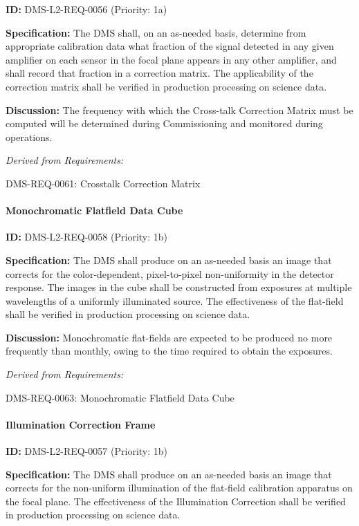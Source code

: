 \documentclass[SE,toc,lsstdraft]{lsstdoc}
\begin{document}
\label{DMS-L2-REQ-0056}
\textbf{ID:} DMS-L2-REQ-0056 (Priority: 1a)

\textbf{Specification:} The DMS shall, on an as-needed basis, determine from appropriate calibration data what fraction of the signal detected in any given amplifier on each sensor in the focal plane appears in any other amplifier, and shall record that fraction in a correction matrix. The applicability of the correction matrix shall be verified in production processing on science data.

\textbf{Discussion: }The frequency with which the Cross-talk Correction Matrix must be computed will be determined during Commissioning and monitored during operations.

\emph{Derived from Requirements:}

DMS-REQ-0061:
Crosstalk Correction Matrix \newline

\paragraph{Monochromatic Flatfield Data Cube}\hfill  %

\label{DMS-L2-REQ-0058}
\textbf{ID:} DMS-L2-REQ-0058 (Priority: 1b)

\textbf{Specification:} The DMS shall produce on an as-needed basis an image that corrects for the color-dependent, pixel-to-pixel non-uniformity in the detector response. The images in the cube shall be constructed from exposures at multiple wavelengths of a uniformly illuminated source. The effectiveness of the flat-field shall be verified in production processing on science data.

\textbf{Discussion:} Monochromatic flat-fields are expected to be produced no more frequently than monthly, owing to the time required to obtain the exposures.

\emph{Derived from Requirements:}

DMS-REQ-0063:
Monochromatic Flatfield Data Cube \newline

\paragraph{Illumination Correction Frame}\hfill  %

\label{DMS-L2-REQ-0057}
\textbf{ID:} DMS-L2-REQ-0057 (Priority: 1b)

\textbf{Specification:} The DMS shall produce on an as-needed basis an image that corrects for the non-uniform illumination of the flat-field calibration apparatus on the focal plane. The effectiveness of the Illumination Correction shall be verified in production processing on science data.
\end{document}
